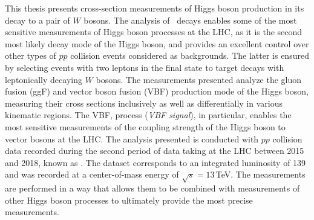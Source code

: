 This thesis presents cross-section measurements of Higgs boson production in its decay to a pair of $W$ bosons.
The analysis of \HWW\ decays enables some of the most sensitive measurements of Higgs boson processes at the LHC, as it is the second most likely decay mode of the Higgs boson, and provides an excellent control over other types of $pp$ collision events considered as backgrounds. The latter is ensured by selecting events with two leptons in the final state to target \HWWdet decays with leptonically decaying $W$ bosons.
The measurements presented analyze the gluon fusion (ggF) and vector boson fusion (VBF) production mode of the Higgs boson, measuring their cross sections inclusively as well as differentially in various kinematic regions.
The VBF, \HWWdet process (\emph{VBF signal}), in particular, enables the most sensitive measurements of the coupling strength of the Higgs boson to vector bosons at the LHC. 
The analysis presented is conducted with $pp$ collision data recorded during the second period of data taking at the LHC between 2015 and 2018, known as \RunTwo. The dataset corresponds to an integrated luminosity of 139\,\ifb and was recorded at a center-of-mass energy of $\sqrt{s} = 13\,$TeV.
The measurements are performed in a way that allows them to be combined with measurements of other Higgs boson processes to ultimately provide the most precise measurements.

